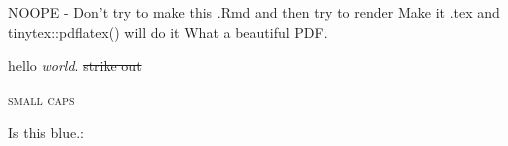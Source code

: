 \documentclass{article}
\begin{document}
NOOPE - Don't try to make this .Rmd and then try to render
Make it .tex and tinytex::pdflatex() will do it
What a beautiful PDF.

hello \emph{world}.
\sout{strike out}    %

\textsc{small caps}

\color{blue}   Is this blue.:   

\end{document}
